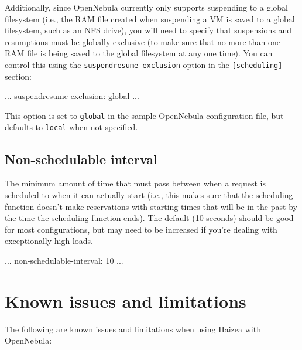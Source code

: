 Additionally, since OpenNebula currently only supports suspending to a global filesystem (i.e., the RAM file created when suspending a VM is saved to a global filesystem, such as an NFS drive), you will need to specify that suspensions and resumptions must be globally exclusive (to make sure that no more than one RAM file is being saved to the global filesystem at any one time). You can control this using the \texttt{suspendresume-exclusion} option in the \texttt{[scheduling]} section:

\begin{wideshellverbatim}
[scheduling]
...
suspendresume-exclusion: global
...
\end{wideshellverbatim}

This option is set to \texttt{global} in the sample OpenNebula configuration file, but defaults to \texttt{local} when not specified.

\subsection{Non-schedulable interval}

The minimum amount of time that must pass between when a request is scheduled to when it can actually start (i.e., this makes sure that the scheduling function doesn't make reservations with starting times that will be in the past by the time the scheduling function ends). The default (10 seconds) should be good for most configurations, but may need to be increased if you're dealing with exceptionally high loads.

\begin{wideshellverbatim}
[scheduling]
...
non-schedulable-interval: 10
...
\end{wideshellverbatim}

\section{Known issues and limitations}

The following are known issues and limitations when using Haizea with OpenNebula:

